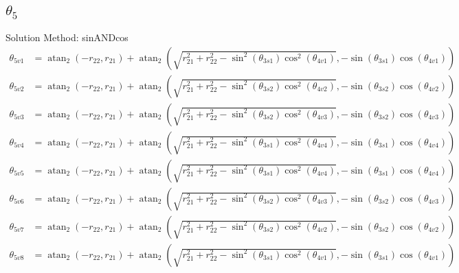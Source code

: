 \documentclass[letterpaper]{article}
\begin{document}
\subsection{$\theta_{5}$ } 
Solution Method: sinANDcos
\begin{align}
  \theta_{5v1} &= \operatorname{atan}_{2}{\left(- r_{22},r_{21} \right)} + \operatorname{atan}_{2}{\left(\sqrt{r_{21}^{2} + r_{22}^{2} - \sin^{2}{\left(\theta_{3s1} \right)} \cos^{2}{\left(\theta_{4v1} \right)}},- \sin{\left(\theta_{3s1} \right)} \cos{\left(\theta_{4v1} \right)} \right)} \\
  \theta_{5v2} &= \operatorname{atan}_{2}{\left(- r_{22},r_{21} \right)} + \operatorname{atan}_{2}{\left(\sqrt{r_{21}^{2} + r_{22}^{2} - \sin^{2}{\left(\theta_{3s2} \right)} \cos^{2}{\left(\theta_{4v2} \right)}},- \sin{\left(\theta_{3s2} \right)} \cos{\left(\theta_{4v2} \right)} \right)} \\
  \theta_{5v3} &= \operatorname{atan}_{2}{\left(- r_{22},r_{21} \right)} + \operatorname{atan}_{2}{\left(\sqrt{r_{21}^{2} + r_{22}^{2} - \sin^{2}{\left(\theta_{3s2} \right)} \cos^{2}{\left(\theta_{4v3} \right)}},- \sin{\left(\theta_{3s2} \right)} \cos{\left(\theta_{4v3} \right)} \right)} \\
  \theta_{5v4} &= \operatorname{atan}_{2}{\left(- r_{22},r_{21} \right)} + \operatorname{atan}_{2}{\left(\sqrt{r_{21}^{2} + r_{22}^{2} - \sin^{2}{\left(\theta_{3s1} \right)} \cos^{2}{\left(\theta_{4v4} \right)}},- \sin{\left(\theta_{3s1} \right)} \cos{\left(\theta_{4v4} \right)} \right)} \\
  \theta_{5v5} &= \operatorname{atan}_{2}{\left(- r_{22},r_{21} \right)} + \operatorname{atan}_{2}{\left(\sqrt{r_{21}^{2} + r_{22}^{2} - \sin^{2}{\left(\theta_{3s1} \right)} \cos^{2}{\left(\theta_{4v4} \right)}},- \sin{\left(\theta_{3s1} \right)} \cos{\left(\theta_{4v4} \right)} \right)} \\
  \theta_{5v6} &= \operatorname{atan}_{2}{\left(- r_{22},r_{21} \right)} + \operatorname{atan}_{2}{\left(\sqrt{r_{21}^{2} + r_{22}^{2} - \sin^{2}{\left(\theta_{3s2} \right)} \cos^{2}{\left(\theta_{4v3} \right)}},- \sin{\left(\theta_{3s2} \right)} \cos{\left(\theta_{4v3} \right)} \right)} \\
  \theta_{5v7} &= \operatorname{atan}_{2}{\left(- r_{22},r_{21} \right)} + \operatorname{atan}_{2}{\left(\sqrt{r_{21}^{2} + r_{22}^{2} - \sin^{2}{\left(\theta_{3s2} \right)} \cos^{2}{\left(\theta_{4v2} \right)}},- \sin{\left(\theta_{3s2} \right)} \cos{\left(\theta_{4v2} \right)} \right)} \\
  \theta_{5v8} &= \operatorname{atan}_{2}{\left(- r_{22},r_{21} \right)} + \operatorname{atan}_{2}{\left(\sqrt{r_{21}^{2} + r_{22}^{2} - \sin^{2}{\left(\theta_{3s1} \right)} \cos^{2}{\left(\theta_{4v1} \right)}},- \sin{\left(\theta_{3s1} \right)} \cos{\left(\theta_{4v1} \right)} \right)} \end{align} 
\end{document}
